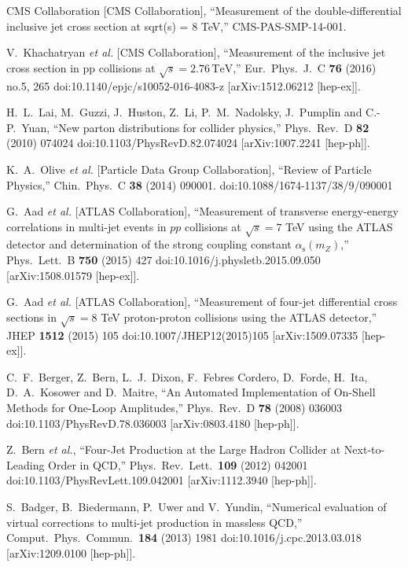 \documentclass{PoS}
\begin{document}
\begin{thebibliography}{99}
  CMS Collaboration [CMS Collaboration],
  ``Measurement of the double-differential inclusive jet cross section at sqrt(s) = 8 TeV,''
  CMS-PAS-SMP-14-001.

  V.~Khachatryan {\it et al.} [CMS Collaboration],
  ``Measurement of the inclusive jet cross section in pp collisions at $\sqrt{s} = 2.76\,\text {TeV}$,''
  Eur.\ Phys.\ J.\ C {\bf 76} (2016) no.5,  265
  doi:10.1140/epjc/s10052-016-4083-z
  [arXiv:1512.06212 [hep-ex]].

  H.~L.~Lai, M.~Guzzi, J.~Huston, Z.~Li, P.~M.~Nadolsky, J.~Pumplin and C.-P.~Yuan,
  ``New parton distributions for collider physics,''
  Phys.\ Rev.\ D {\bf 82} (2010) 074024
  doi:10.1103/PhysRevD.82.074024
  [arXiv:1007.2241 [hep-ph]].

  K.~A.~Olive {\it et al.} [Particle Data Group Collaboration],
  ``Review of Particle Physics,''
  Chin.\ Phys.\ C {\bf 38} (2014) 090001.
  doi:10.1088/1674-1137/38/9/090001

  G.~Aad {\it et al.} [ATLAS Collaboration],
  ``Measurement of transverse energy-energy correlations in multi-jet events in $pp$ collisions at $\sqrt{s} = 7$ TeV using the ATLAS detector and determination of the strong coupling constant $\alpha_{\mathrm{s}}(m_Z)$,''
  Phys.\ Lett.\ B {\bf 750} (2015) 427
  doi:10.1016/j.physletb.2015.09.050
  [arXiv:1508.01579 [hep-ex]]. 

  G.~Aad {\it et al.} [ATLAS Collaboration],
  ``Measurement of four-jet differential cross sections in $\sqrt{s}=8$ TeV proton-proton collisions using the ATLAS detector,''
  JHEP {\bf 1512} (2015) 105
  doi:10.1007/JHEP12(2015)105
  [arXiv:1509.07335 [hep-ex]].

  C.~F.~Berger, Z.~Bern, L.~J.~Dixon, F.~Febres Cordero, D.~Forde, H.~Ita, D.~A.~Kosower and D.~Maitre,
  ``An Automated Implementation of On-Shell Methods for One-Loop Amplitudes,''
  Phys.\ Rev.\ D {\bf 78} (2008) 036003
  doi:10.1103/PhysRevD.78.036003
  [arXiv:0803.4180 [hep-ph]].

  Z.~Bern {\it et al.},
  ``Four-Jet Production at the Large Hadron Collider at Next-to-Leading Order in QCD,''
  Phys.\ Rev.\ Lett.\  {\bf 109} (2012) 042001
  doi:10.1103/PhysRevLett.109.042001
  [arXiv:1112.3940 [hep-ph]].

  S.~Badger, B.~Biedermann, P.~Uwer and V.~Yundin,
  ``Numerical evaluation of virtual corrections to multi-jet production in massless QCD,''
  Comput.\ Phys.\ Commun.\  {\bf 184} (2013) 1981
  doi:10.1016/j.cpc.2013.03.018
  [arXiv:1209.0100 [hep-ph]].


\end{thebibliography}
\end{document}

